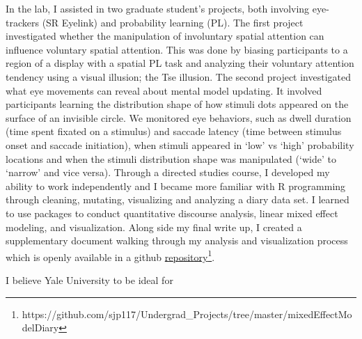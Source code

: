 \documentclass[12pt]{article}
\begin{document}
	In the lab, I assisted in two graduate student's projects, both involving eye-trackers (SR Eyelink) and probability learning (PL). The first project investigated whether the manipulation of involuntary spatial attention can influence voluntary spatial attention. This was done by biasing participants to a region of a display with a spatial PL task and analyzing their voluntary attention tendency using a visual illusion; the Tse illusion. The second project investigated what eye movements can reveal about mental model updating. It involved participants learning the distribution shape of how stimuli dots appeared on the surface of an invisible circle. We monitored eye behaviors, such as dwell duration (time spent fixated on a stimulus) and saccade latency (time between stimulus onset and saccade initiation), when stimuli appeared in `low' vs `high' probability locations and when the stimuli distribution shape was manipulated (`wide' to `narrow' and vice versa). Through a directed studies course, I developed my ability to work independently and I became more familiar with R programming through cleaning, mutating, visualizing and analyzing a diary data set. I learned to use packages to conduct quantitative discourse analysis, linear mixed effect modeling, and visualization. Along side my final write up, I created a supplementary document walking through my analysis and visualization process which is openly available in a github \href{https://github.com/sjp117/Undergrad_Projects/tree/master/mixedEffectModelDiary}{repository}\footnote{https://github.com/sjp117/Undergrad\_Projects/tree/master/mixedEffectModelDiary}.
	
	I believe Yale University to be ideal for 
	
\end{document}
